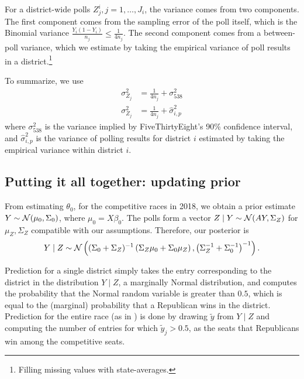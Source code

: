 \documentclass[11pt]{article}
\begin{document}
For a district-wide polls $Z_j^i, j = 1,\ldots,J_i$, the variance comes from two components. The first component comes from the sampling error of the poll itself, which is the Binomial variance $\frac{Y_i(1-Y_i)}{n_j} \le \frac{1}{4n_j}$. The second component comes from a between-poll variance, which we estimate by taking the empirical variance of poll results in a district.\footnote{Filling missing values with state-averages.} 

To summarize, we use \begin{align*}
\sigma^2_{Z_j} &= \frac{1}{4n_j} + \sigma^2_{538} \tag{Estimation for generic ballot poll variance}\\
\sigma^2_{Z_j} &= \frac{1}{4n_j} + \hat\sigma^2_{i,p} \tag{Estimation for district poll variance}
\end{align*}
where $ \sigma^2_{538}$ is the variance implied by FiveThirtyEight's 90\% confidence interval, and $\hat \sigma_{i,p}^2$ is the variance of polling results for district $i$ estimated by taking the empirical variance within district $i$.

\subsection{Putting it all together: updating prior}
From estimating $\theta_0$, for the competitive races in 2018, we obtain a prior estimate $Y \sim \mathcal{N}(\mu_0, \Sigma_0)$, where $\mu_0 = X\beta_0$. The polls form a vector $Z \mid Y \sim \mathcal{N}(AY, \Sigma_Z)$ for $\mu_Z, \Sigma_Z$ compatible with our assumptions. Therefore, our posterior is \[
Y\mid Z \sim \mathcal{N}\left({(\Sigma_0 + \Sigma_Z)^{-1} \left({\Sigma_Z\mu_0 + \Sigma_0 \mu_Z}\right), \left({\Sigma_Z^{-1} + \Sigma_0^{-1}}\right)^{-1}}\right).
\]

Prediction for a single district simply takes the entry corresponding to the
district in the distribution $Y \mid Z$, a marginally Normal distribution, and
computes the probability that the Normal random variable is greater than $0.5$,
which is equal to the (marginal) probability that a Republican wins in the
district. Prediction for the entire race (as in 
) is done by drawing
$\tilde y$ from $Y \mid Z$ and computing the number of entries for which
$\tilde y_j > 0.5$, as the seats that Republicans win among the competitive
seats.

\end{document}
